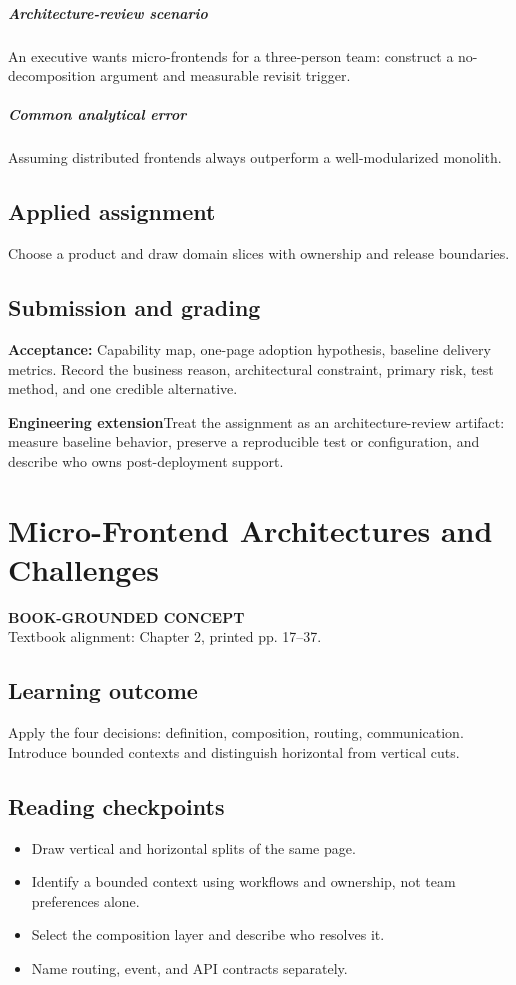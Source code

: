 \documentclass[11pt,letterpaper,oneside]{report}
\newcommand{\based}[1]{\begin{sourcebox}\textbf{BOOK-GROUNDED CONCEPT}\\#1\end{sourcebox}}
\newcommand{\criterion}[1]{\textbf{Acceptance:} #1}
\begin{document}
\paragraph{Architecture-review scenario} An executive wants micro-frontends for a three-person team: construct a no-decomposition argument and measurable revisit trigger.
\paragraph{Common analytical error} Assuming distributed frontends always outperform a well-modularized monolith.
\section{Applied assignment}
Choose a product and draw domain slices with ownership and release boundaries.
\section{Submission and grading}
\criterion{Capability map, one-page adoption hypothesis, baseline delivery metrics. Record the business reason, architectural constraint, primary risk, test method, and one credible alternative.}
\begin{engineerbox}\textbf{Engineering extension}\newline Treat the assignment as an architecture-review artifact: measure baseline behavior, preserve a reproducible test or configuration, and describe who owns post-deployment support.\end{engineerbox}

\chapter{Micro-Frontend Architectures and Challenges}
\based{Textbook alignment: Chapter 2, printed pp. 17--37.}
\section{Learning outcome}
Apply the four decisions: definition, composition, routing, communication. Introduce bounded contexts and distinguish horizontal from vertical cuts.
\section{Reading checkpoints}
\begin{itemize}\item Draw vertical and horizontal splits of the same page.
\item Identify a bounded context using workflows and ownership, not team preferences alone.
\item Select the composition layer and describe who resolves it.
\item Name routing, event, and API contracts separately.
\end{itemize}
\end{document}
